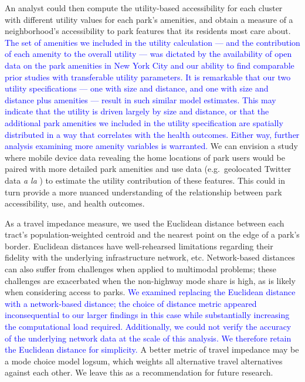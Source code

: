 \documentclass[shortAfour,sageh.bst]{sagej}
\begin{document}
An analyst could then compute the utility-based accessibility for each
cluster with different utility values for each park's amenities, and
obtain a measure of a neighborhood's accessibility to park features that
its residents most care about. \textcolor{blue}{The set of amenities we included in the
utility calculation --- and the contribution of each amenity to the
overall utility --- was dictated by the availability of open data on the
park amenities in New York City and our ability to find comparable prior
studies with transferable utility parameters. It is remarkable that our
two utility specifications --- one with size and distance, and one with
size and distance plus amenities --- result in such similar model
estimates. This may indicate that the utility is driven largely by size
and distance, or that the additional park amenities we included in the
utility specification are spatially distributed in a way that correlates
with the health outcomes. Either way, further analysis examining more
amenity variables is warranted.} We can envision a study where mobile
device data revealing the home locations of park users would be paired
with more detailed park amenities and use data (e.g.~geolocated Twitter
data \emph{a la} \citet{roberts2017using}) to estimate the utility
contribution of these features. This could in turn provide a more
nuanced understanding of the relationship between park accessibility,
use, and health outcomes.

As a travel impedance measure, we used the Euclidean distance between
each tract's population-weighted centroid and the nearest point on the
edge of a park's border. Euclidean distances have well-rehearsed
limitations regarding their fidelity with the underlying infrastructure
network, etc. Network-based distances can also suffer from challenges
when applied to multimodal problems; these challenges are exacerbated
when the non-highway mode share is high, as is likely when considering
access to parks. \textcolor{blue}{We examined replacing the Euclidean distance with a
network-based distance; the choice of distance metric appeared
inconsequential to our larger findings in this case while substantially
increasing the computational load required. Additionally, we could not
verify the accuracy of the underlying network data at the scale of this
analysis. We therefore retain the Euclidean distance for simplicity.} A
better metric of travel impedance may be a mode choice model logsum,
which weights all alternative travel alternatives against each other. We
leave this as a recommendation for future research.
\end{document}
